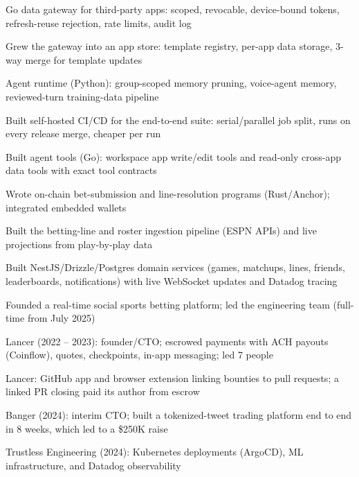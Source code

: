 \documentclass[print]{jack-resume}
\begin{document}
\begin{tightemize}
    \item Go data gateway for third-party apps: scoped, revocable, device-bound tokens, refresh-reuse rejection, rate limits, audit log
    \item Grew the gateway into an app store: template registry, per-app data storage, 3-way merge for template updates
    \item Agent runtime (Python): group-scoped memory pruning, voice-agent memory, reviewed-turn training-data pipeline
    \item Built self-hosted CI/CD for the end-to-end suite: serial/parallel job split, runs on every release merge, cheaper per run
    \item Built agent tools (Go): workspace app write/edit tools and read-only cross-app data tools with exact tool contracts
\end{tightemize}
\sectionsep

\begin{tightemize}
    \item Wrote on-chain bet-submission and line-resolution programs (Rust/Anchor); integrated embedded wallets
    \item Built the betting-line and roster ingestion pipeline (ESPN APIs) and live projections from play-by-play data
    \item Built NestJS/Drizzle/Postgres domain services (games, matchups, lines, friends, leaderboards, notifications) with live WebSocket updates and Datadog tracing
    \item Founded a real-time social sports betting platform; led the engineering team (full-time from July 2025)
\end{tightemize}
\sectionsep

\begin{tightemize}
    \item Lancer (2022 -- 2023): founder/CTO; escrowed payments with ACH payouts (Coinflow), quotes, checkpoints, in-app messaging; led 7 people
    \item Lancer: GitHub app and browser extension linking bounties to pull requests; a linked PR closing paid its author from escrow
    \item Banger (2024): interim CTO; built a tokenized-tweet trading platform end to end in 8 weeks, which led to a \$250K raise
    \item Trustless Engineering (2024): Kubernetes deployments (ArgoCD), ML infrastructure, and Datadog observability
\end{tightemize}
\sectionsep
\end{document}
